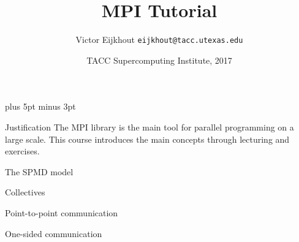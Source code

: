 \documentclass[dvipsnames,aspectratio=169,10pt]{beamer}
\def\Location{TACC Supercomputing Institute, 2017}
\begin{document}
\parskip=10pt plus 5pt minus 3pt

\title{MPI Tutorial}
\author{Victor Eijkhout {\tt eijkhout@tacc.utexas.edu}}
\date{\Location}

\begin{frame}
  \titlepage
\end{frame}

\begin{frame}{Justification}
  The MPI library is the main tool
  for parallel programming on a large scale.
  This course introduces the main concepts
  through lecturing and exercises.
\end{frame}

 {The SPMD model}


 {Collectives}



 {Point-to-point communication}


 {One-sided communication}


\begin{comment}
    \Level 0 {Complicated data}
    

    \Level 0 {Sub-computations}
    

    \Level 0 {MPI File I/O}
    


    \Level 0 {Process management}
    
\end{comment}
\end{document}
